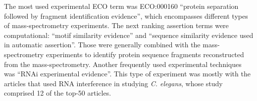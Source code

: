 \documentclass[12pt]{article}
\begin{document}
The most used experimental ECO term was ECO:000160 ``protein separation followed by fragment
identification evidence'', which encompasses different types of mass-spectrometry experiments. The
next ranking assertion terms were computational: ``motif similarity evidence'' and ``sequence
similarity evidence used in automatic assertion''. Those were generally combined with the
mass-spectrometry experiments to identify protein sequence fragments reconstructed from the
mass-spectrometry. Another frequently used experimental techniques was ``RNAi experimental
evidence''. This type of experiment was mostly with the articles that used RNA interference in
studying \textit{C. elegans}, whose study comprised 12 of the top-50 articles.

% 
% 
% 
% 
\end{document}
